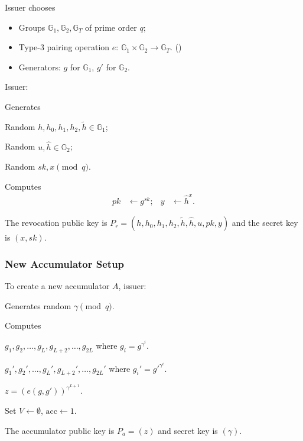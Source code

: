 Issuer chooses
\begin{itemize}
    \item Groups $\mathbb{G}_1,\mathbb{G}_2,\mathbb{G}_T$ of
    prime order $q$;
    \item Type-3 pairing operation $e:\, \mathbb{G}_1\times\mathbb{G}_2\rightarrow\mathbb{G}_T$. (\cite{GPS08})
    \item Generators: $g$ for $\mathbb{G}_1$, $g'$ for
    $\mathbb{G}_2$.
\end{itemize}

Issuer:
\begin{legal}
    \item Generates
    \begin{legal}
        \item Random $h,h_0,h_1,h_2,\widetilde{h}\in \mathbb{G}_1$;
        \item Random $u,\widehat{h}\in \mathbb{G}_2$;
        \item Random $sk,x \pmod{q}$.
    \end{legal}
    \item Computes 
\begin{align*}
    pk&\leftarrow g^{sk}; & y&\leftarrow \widehat{h}^x.
\end{align*}
\end{legal}

The revocation public key is
$P_r = (h,h_0,h_1,h_2,\widetilde{h},\widehat{h},u,pk,y)$ and the secret key is $(x,sk)$.
\subsubsection{New Accumulator Setup}
To create a new accumulator $A$, issuer:
\begin{legal}
\item Generates random $\gamma\pmod{q}$.
\item Computes
\begin{legal}
    \item $g_1,g_2,\ldots,g_L,g_{L+2},\ldots,g_{2L}$ where
$g_i = g^{\gamma^i}$. 
    \item $g_1',g_2',\ldots,g_L',g_{L+2}',\ldots,g_{2L}'$ where
$g_i' = g'^{\gamma^i}$. 
    \item $z = (e(g,g'))^{\gamma^{L+1}}$.
\end{legal}
\item Set $V \leftarrow\emptyset$, $\mathrm{acc}\leftarrow 1$.
\end{legal}
The accumulator public key is $P_a = (z)$ and secret key is $(\gamma)$.

